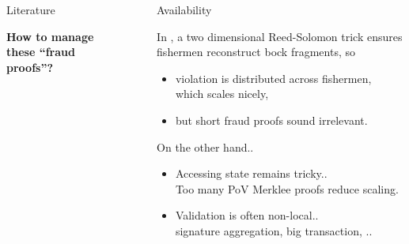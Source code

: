 \documentclass[final]{beamer}
\newlength{\sepwid}
\newlength{\onecolwid}
\newlength{\twocolwid}
\begin{document}
\begin{frame}[t]
\begin{columns}[t]
\begin{column}{\onecolwid}
\begin{block}{Literature}
\bigskip
\bigskip

\textbf{How to manage these ``fraud proofs''?}

\end{block}


\end{column} %

\begin{column}{\sepwid}\end{column} %

\begin{column}{\twocolwid} %

\begin{columns}[t,totalwidth=\twocolwid] %

\begin{column}{\onecolwid}\vspace{-.6in} %


\begin{block}{Availability}

% 

In \cite{FraudProofs}, a two dimensional Reed-Solomon trick ensures 
fishermen reconstruct bock fragments, so

\begin{itemize}
\item violation is distributed across fishermen, \\ which scales nicely,
\item but short fraud proofs sound irrelevant.
\end{itemize}

\bigskip On the other hand..

\begin{itemize}
\item Accessing state remains tricky.. \\
Too many PoV Merklee proofs reduce scaling.
\item Validation is often non-local.. \\
signature aggregation, big transaction, ..
\end{itemize}


\end{block}
\end{column}
\end{columns}
\end{column}
\end{columns}
\end{frame}
\end{document}
